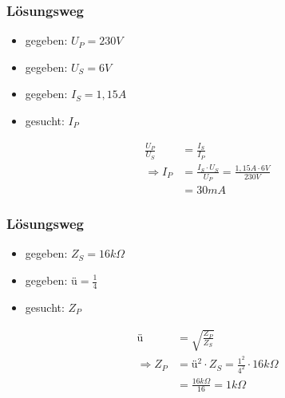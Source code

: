 \begin{frame}
\frametitle{Lösungsweg}
\begin{itemize}
  \item gegeben: $U_P = 230V$
  \item gegeben: $U_S = 6V$
  \item gegeben: $I_S = 1,15A$
  \item gesucht: $I_P$
  \end{itemize}
    \pause
    \begin{equation}\begin{align} \nonumber \frac{U_P}{U_S} &= \frac{I_S}{I_P} \\ \nonumber \Rightarrow I_P &= \frac{I_S \cdot U_S}{U_P} = \frac{1,15A \cdot 6V}{230V} \\ \nonumber &= 30mA \end{align}\end{equation}



\end{frame}

\begin{frame}
\end{frame}

\begin{frame}
\frametitle{Lösungsweg}
\begin{itemize}
  \item gegeben: $Z_S = 16k\Omega$
  \item gegeben: $ü = \frac{1}{4}$
  \item gesucht: $Z_P$
  \end{itemize}
    \pause
    \begin{equation}\begin{align} \nonumber ü &= \sqrt{\frac{Z_P}{Z_S}} \\ \nonumber \Rightarrow Z_P &= ü^2 \cdot Z_S = \frac{1^2}{4^2} \cdot 16k\Omega \\ \nonumber &= \frac{16k\Omega}{16} = 1k\Omega \end{align}\end{equation}



\end{frame}

